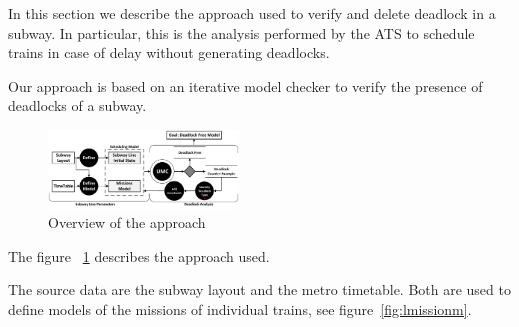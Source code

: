 



In this section we describe the approach used to verify and delete deadlock in a subway.
In particular, this is the analysis performed by the ATS to schedule trains in case of delay without generating deadlocks.


Our approach is based on an iterative model checker to verify the presence of deadlocks of a subway.

\begin{figure}[h!]
	\begin{centering}	
	\includegraphics[width=0.45\textwidth, clip]{img/processo}
	\caption{Overview of the approach}
	\label{fig:process}
	\end{centering}
\end{figure}

The figure ~\ref{fig:process} describes the approach used.


The source data are the subway  layout and the metro timetable. Both are used to define models of the missions of individual trains, see figure~\ref{fig:lmissionm}.


